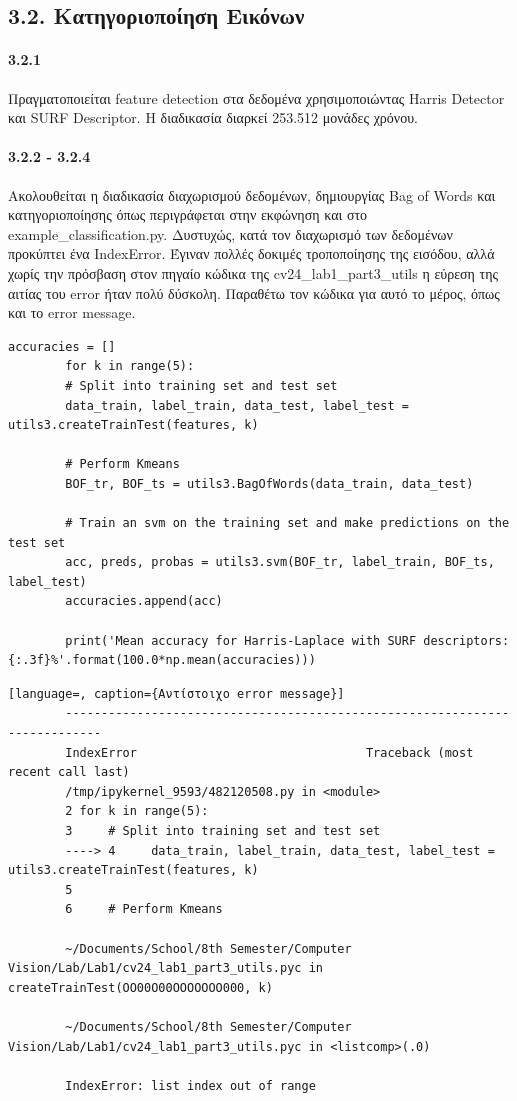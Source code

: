 \documentclass[]{article}
\begin{document}
	\subsection*{3.2. Κατηγοριοποίηση Εικόνων}
	\paragraph{3.2.1 } Πραγματοποιείται feature detection στα δεδομένα χρησιμοποιώντας Harris Detector και SURF Descriptor. Η διαδικασία διαρκεί 253.512 μονάδες χρόνου.
	\paragraph{3.2.2 - 3.2.4} Ακολουθείται η διαδικασία διαχωρισμού δεδομένων, δημιουργίας Bag of Words και κατηγοριοποίησης όπως περιγράφεται στην εκφώνηση και στο example\_classification.py. Δυστυχώς, κατά τον διαχωρισμό των δεδομένων προκύπτει ένα IndexError. Έγιναν πολλές δοκιμές τροποποίησης της εισόδου, αλλά χωρίς την πρόσβαση στον πηγαίο κώδικα της cv24\_lab1\_part3\_utils η εύρεση της αιτίας του error ήταν πολύ δύσκολη. Παραθέτω τον κώδικα για αυτό το μέρος, όπως και το error message.
	\begin{lstlisting}[caption={Υλοποίηση βημάτων 3.2.2 - 3.2.4}]
		accuracies = []
		for k in range(5):
		# Split into training set and test set
		data_train, label_train, data_test, label_test = utils3.createTrainTest(features, k)
		
		# Perform Kmeans
		BOF_tr, BOF_ts = utils3.BagOfWords(data_train, data_test)
		
		# Train an svm on the training set and make predictions on the test set
		acc, preds, probas = utils3.svm(BOF_tr, label_train, BOF_ts, label_test)
		accuracies.append(acc)
		
		print('Mean accuracy for Harris-Laplace with SURF descriptors: {:.3f}%'.format(100.0*np.mean(accuracies)))
	\end{lstlisting}
	\begin{lstlisting}[language=, caption={Αντίστοιχο error message}]
		---------------------------------------------------------------------------
		IndexError                                Traceback (most recent call last)
		/tmp/ipykernel_9593/482120508.py in <module>
		2 for k in range(5):
		3     # Split into training set and test set
		----> 4     data_train, label_train, data_test, label_test = utils3.createTrainTest(features, k)
		5 
		6     # Perform Kmeans
		
		~/Documents/School/8th Semester/Computer Vision/Lab/Lab1/cv24_lab1_part3_utils.pyc in createTrainTest(OO00O00OOOOOOO000, k)
		
		~/Documents/School/8th Semester/Computer Vision/Lab/Lab1/cv24_lab1_part3_utils.pyc in <listcomp>(.0)
		
		IndexError: list index out of range
	\end{lstlisting}
\end{document}
